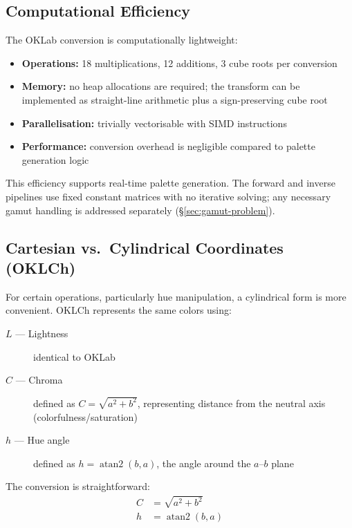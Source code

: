 \subsection{Computational Efficiency}

The OKLab conversion is computationally lightweight:
\begin{itemize}
    \item \textbf{Operations:} 18 multiplications, 12 additions, 3 cube roots per conversion
    \item \textbf{Memory:} no heap allocations are required; the transform can be implemented as straight-line arithmetic plus a sign-preserving cube root
    \item \textbf{Parallelisation:} trivially vectorisable with SIMD instructions
    \item \textbf{Performance:} conversion overhead is negligible compared to palette generation logic
\end{itemize}

This efficiency supports real-time palette generation. The forward and inverse pipelines use fixed constant matrices with no iterative solving; any necessary gamut handling is addressed separately (\S\ref{sec:gamut-problem}).

\subsection{Cartesian vs.\ Cylindrical Coordinates (OKLCh)}
\label{sec:oklch}

For certain operations, particularly hue manipulation, a cylindrical form is more convenient. OKLCh represents the same colors using:

\begin{description}
    \item[$L$ --- Lightness] identical to OKLab
    \item[$C$ --- Chroma] defined as $C = \sqrt{a^2 + b^2}$, representing distance from the neutral axis (colorfulness/saturation)
    \item[$h$ --- Hue angle] defined as $h = \operatorname{atan2}(b, a)$, the angle around the $a$–$b$ plane
\end{description}

The conversion is straightforward:
\begin{align}
    C &= \sqrt{a^2 + b^2} \label{eq:chroma} \\
    h &= \operatorname{atan2}(b, a) \label{eq:hue-angle}
\end{align}

